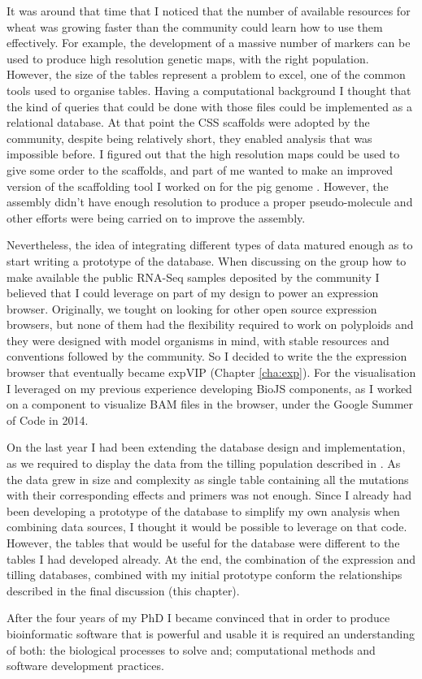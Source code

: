 It was around that time that I noticed that the number of available resources for wheat was growing faster than the community could learn how to use them effectively. 
For example, the development of a massive number of markers can be used to produce high resolution genetic maps, with the right population. 
However, the size of the tables represent a problem to excel, one of the common tools used to organise tables. 
Having a computational background I thought that the kind of queries that could be done with those files could be implemented as a relational database. 
At that point the CSS scaffolds were adopted by the community, despite being relatively short, they enabled analysis that was impossible before. 
I figured out that the high resolution maps could be used to give some order to the scaffolds, and part of me wanted to make an improved version of the scaffolding tool I worked on for the pig genome \citep{Groenen2012a}.
However, the assembly didn't have enough resolution to produce a proper pseudo-molecule and other efforts were being carried on to improve the assembly.

Nevertheless, the idea of integrating different types of data matured enough as to start writing a prototype of the database. 
When discussing on the group how to make available the public RNA-Seq samples deposited by the community I believed that I could leverage on part of my design to power an expression browser. 
Originally, we tought on looking for other open source expression browsers, but none of them had the flexibility required to work on polyploids and they were designed with model organisms in mind, with stable resources and conventions followed by the community. 
So I decided to write the the expression browser that eventually became expVIP (Chapter \ref{cha:exp}). 
For the visualisation I leveraged on my previous experience developing BioJS components, as I worked on a component to visualize BAM files in the browser, under the Google Summer of Code in 2014. 

On the last year I had been extending the database design and implementation, as we required to display the data from the tilling population described in \citet{Krasileva2016}. 
As the data grew in size and complexity as single table containing all the mutations with their corresponding effects and primers was not enough. 
Since I already had been developing a prototype of the database to simplify my own analysis when combining data sources, I thought it would be possible to leverage on that code. 
However, the tables that would be useful for the database were different to the tables I had developed already. 
At the end, the combination of the expression and tilling databases, combined with my initial prototype conform the relationships described in the final discussion (this chapter). 

After the four years of my PhD I became convinced that in order to produce bioinformatic software that is powerful and usable it is required an understanding of both: the biological processes to solve and; computational methods and software development practices.
